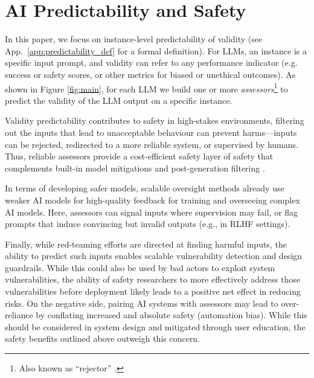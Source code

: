 \documentclass[11pt]{article}
\begin{document}
\section{AI Predictability and Safety}
\label{sec:predictability_safety}





In this paper, %
we focus on instance-level 
predictability of validity (see App.~\ref{app:predictability_def} 
for a formal definition). For LLMs, an instance is a specific input prompt, and validity can refer to any performance indicator (e.g. success or safety scores, or other metrics for biased or unethical outcomes). %
As shown in Figure \ref{fig:main}, for each LLM we build one or more \textit{assessors}\footnote{Also known as  ``rejector'' \citep{hendrickx2024machine}.} \citep{hernandez2022training} to predict the validity of the LLM output on a specific instance. 



















Validity predictability contributes to safety %
in high-stakes environments, filtering  out the inputs that lead to unacceptable behaviour can prevent harms---inputs can be rejected, redirected to a more reliable system, or supervised by humans. Thus, reliable assessors provide a cost-efficient safety layer of safety that complements built-in model mitigations  and post-generation filtering \cite{hernandez2022training, zhou2024predictableartificialintelligence}.



In terms of developing safer models, 
scalable oversight methods \cite{Leike2018ScalableAA, Christiano2018SupervisingSL, burns2023weak, kenton2024scalable} already use weaker AI models for high-quality feedback for training and overseeing complex AI models. Here, assessors can signal inputs where supervision may fail, or flag prompts that induce convincing but invalid outputs (e.g., in RLHF settings). %




Finally, while red-teaming efforts \cite{council2023ai}  are directed at finding harmful inputs, the ability to predict such inputs enables scalable vulnerability detection and design guardrails. %
While this could also be used by bad actors to exploit system vulnerabilities, the ability of safety researchers to more effectively address those vulnerabilities before deployment likely leads to a positive net effect in reducing risks. On the negative side, pairing AI systems with assessors may lead to over-reliance by conflating increased and absolute safety (automation bias). While this should be considered in system design and mitigated through user education, the safety benefits outlined above outweigh this concern.
\end{document}

